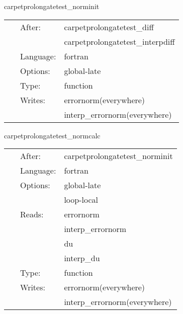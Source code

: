 \vspace{5mm}


\hspace{5mm} carpetprolongatetest\_norminit 

\hspace{5mm}{\it calculate error norm } 


\hspace{5mm}

 \begin{tabular*}{160mm}{cll} 
~ & After:  & carpetprolongatetest\_diff \\ 
~& ~ &carpetprolongatetest\_interpdiff\\ 
~ & Language:  & fortran \\ 
~ & Options:  & global-late \\ 
~ & Type:  & function \\ 
~ & Writes:  & errornorm(everywhere) \\ 
~& ~ &interp\_errornorm(everywhere)\\ 
\end{tabular*} 


\vspace{5mm}


\hspace{5mm} carpetprolongatetest\_normcalc 

\hspace{5mm}{\it calculate error norm } 


\hspace{5mm}

 \begin{tabular*}{160mm}{cll} 
~ & After:  & carpetprolongatetest\_norminit \\ 
~ & Language:  & fortran \\ 
~ & Options:  & global-late \\ 
~& ~ &loop-local\\ 
~ & Reads:  & errornorm \\ 
~& ~ &interp\_errornorm\\ 
~& ~ &du\\ 
~& ~ &interp\_du\\ 
~ & Type:  & function \\ 
~ & Writes:  & errornorm(everywhere) \\ 
~& ~ &interp\_errornorm(everywhere)\\ 
\end{tabular*} 


